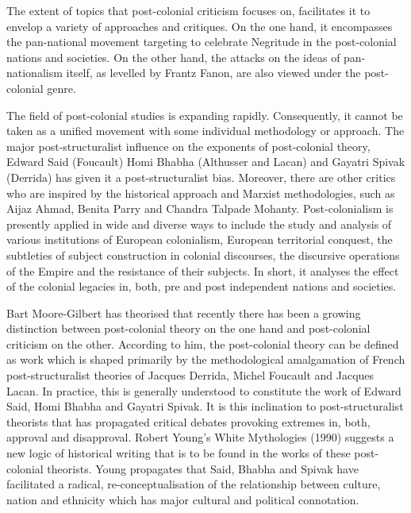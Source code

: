 The  extent  of  topics  that  post-colonial  criticism  focuses  on,  facilitates  it  to  envelop  a  variety  of  approaches  and  critiques.  On  the  one  hand,  it  encompasses  the  pan-national  movement  targeting  to  celebrate  Negritude  in  the  post-colonial  nations  and  societies.  On  the  other  hand,  the  attacks  on  the  ideas  of  pan-nationalism  itself,  as  levelled  by  Frantz  Fanon,  are  also  viewed  under  the  post-colonial  genre.

The  field  of  post-colonial  studies  is  expanding  rapidly.  Consequently,  it  cannot  be  taken  as  a  unified  movement  with  some  individual  methodology  or  approach.  The  major  post-structuralist  influence  on  the  exponents  of  post-colonial  theory,  Edward  Said  (Foucault)  Homi  Bhabha  (Althusser  and  Lacan)  and  Gayatri  Spivak  (Derrida)  has  given  it  a  post-structuralist  bias.  Moreover,  there  are  other  critics  who  are  inspired  by  the  historical  approach  and  Marxist  methodologies,  such  as  Aijaz  Ahmad,  Benita  Parry  and  Chandra  Talpade  Mohanty.  Post-colonialism  is  presently  applied  in  wide  and  diverse  ways  to  include  the  study  and  analysis  of  various  institutions  of  European  colonialism,  European  territorial  conquest,  the  subtleties  of  subject  construction  in  colonial  discourses,  the  discursive  operations  of  the  Empire  and  the  resistance  of  their  subjects.  In  short,  it  analyses  the  effect  of  the  colonial  legacies  in,  both,  pre  and  post  independent  nations  and  societies.

Bart  Moore-Gilbert  has  theorised  that  recently  there  has  been  a  growing  distinction  between  post-colonial  theory  on  the  one  hand  and  post-colonial  criticism  on  the  other.  According  to  him,  the  post-colonial  theory  can  be  defined  as  work  which  is  shaped  primarily  by  the  methodological  amalgamation  of  French  post-structuralist  theories  of  Jacques  Derrida,  Michel  Foucault  and  Jacques  Lacan.  In  practice,  this  is  generally  understood  to  constitute  the  work  of  Edward  Said,  Homi  Bhabha  and  Gayatri  Spivak.  It  is  this  inclination  to  post-structuralist  theorists  that  has  propagated  critical  debates  provoking  extremes  in,  both,  approval  and  disapproval.  Robert  Young’s  White  Mythologies  (1990)  suggests  a  new  logic  of  historical  writing  that  is  to  be  found  in  the  works  of  these  post-colonial  theorists.  Young  propagates  that  Said,  Bhabha  and  Spivak  have  facilitated  a  radical,  re-conceptualisation  of  the  relationship  between  culture,  nation  and  ethnicity  which  has  major  cultural  and  political  connotation.  


